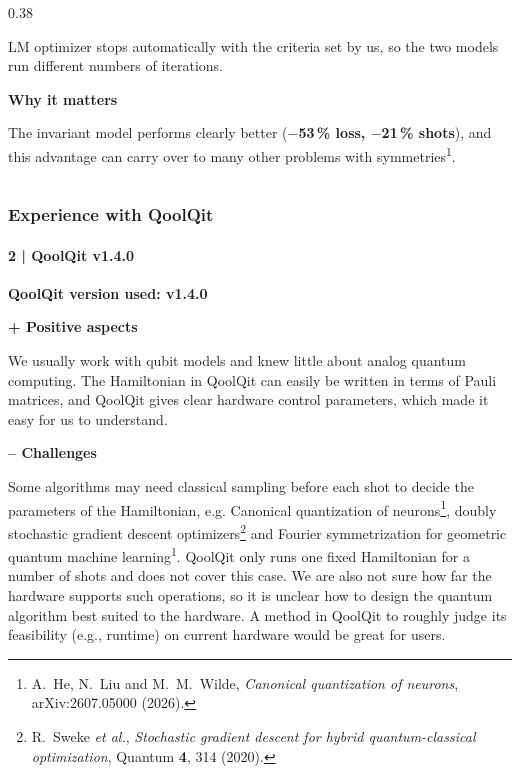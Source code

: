 \documentclass[aspectratio=169,9pt]{beamer}
\newcommand{\qversion}{1.4.0}   %
\newcommand{\head}[2][pq]{{\color{#1}\textbf{#2}}\par\vspace{0.4ex}}
\begin{document}
\begin{frame}[t]
\begin{columns}[T,onlytextwidth]
\begin{column}{0.38\textwidth}
\vspace{0.4ex}
\raggedright
{\scriptsize LM optimizer stops automatically with the criteria set by us, so the two models run different numbers of iterations.\par}
\vspace{0.6ex}
\footnotesize
\head{Why it matters}
The invariant model performs clearly better
(\textcolor{good}{\textbf{$-$53\,\% loss, $-$21\,\% shots}}),
and this advantage can carry over to many other problems with symmetries\textsuperscript{1}.
\end{column}
\end{columns}
\end{frame}

\begin{frame}[c]
\frametitle{Experience with QoolQit}
\framesubtitle{2 \;|\; QoolQit v\qversion}
\small
{\large\textbf{QoolQit version used: v\qversion}}\par
\vspace{2ex}
\head[good]{\large + \;Positive aspects}
We usually work with qubit models and knew little about analog quantum computing. The
Hamiltonian in QoolQit can easily be written in terms of Pauli matrices, and QoolQit gives
clear hardware control parameters, which made it easy for us to understand.

\vspace{3ex}
\head[warn]{\large -- \;Challenges}
Some algorithms may need classical sampling before each shot to decide the parameters of the
Hamiltonian, e.g. Canonical quantization of neurons\footnote[frame]{A.~He, N.~Liu and M.~M.~Wilde, \emph{Canonical quantization of neurons}, arXiv:2607.05000 (2026).},
doubly stochastic gradient descent
optimizers\footnote[frame]{R.~Sweke \emph{et al.}, \emph{Stochastic gradient descent for hybrid quantum-classical optimization}, Quantum \textbf{4}, 314 (2020).}
and Fourier symmetrization for geometric quantum machine learning\textsuperscript{1}.
QoolQit only runs one fixed Hamiltonian for a number of shots and does not cover this case.
We are also not sure how far the hardware supports such operations, so it is unclear how to
design the quantum algorithm best suited to the hardware. A method in QoolQit to roughly judge its feasibility (e.g., runtime) on current hardware would be great for users.
\end{frame}
\end{document}
